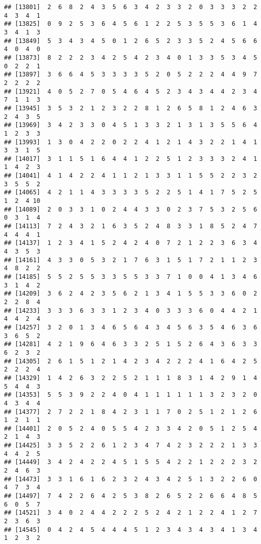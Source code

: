\documentclass[
]{article}
\begin{document}
\begin{verbatim}
## [13801]  2  6  8  2  4  3  5  6  3  4  2  3  3  2  0  3  3  3  2  2  4  3  4  1
## [13825]  0  9  2  5  3  6  4  5  6  1  2  2  5  3  5  5  3  6  1  4  3  4  1  3
## [13849]  5  3  4  3  4  5  0  1  2  6  5  2  3  3  5  2  4  5  6  6  4  0  4  0
## [13873]  8  2  2  2  3  4  2  5  4  2  3  4  0  1  3  3  5  3  4  5  0  2  2  1
## [13897]  3  6  6  4  5  3  3  3  3  5  2  0  5  2  2  2  4  4  9  7  2  2  2  2
## [13921]  4  0  5  2  7  0  5  4  6  4  5  2  3  4  3  4  4  2  3  4  7  1  1  3
## [13945]  3  5  3  2  1  2  3  2  2  8  1  2  6  5  8  1  2  4  6  3  2  4  3  5
## [13969]  3  4  2  3  3  0  4  5  1  3  3  2  1  3  1  3  5  5  6  4  1  2  3  3
## [13993]  1  3  0  4  2  2  0  2  2  4  1  2  1  4  3  2  2  1  4  1  3  3  1  5
## [14017]  3  1  1  5  1  6  4  4  1  2  2  5  1  2  3  3  3  2  4  1  1  4  2  3
## [14041]  4  1  4  2  2  4  1  1  2  1  3  3  1  1  5  5  2  2  3  2  3  5  5  2
## [14065]  4  2  1  1  4  3  3  3  3  5  2  2  5  1  4  1  7  5  2  5  1  2  4 10
## [14089]  2  0  3  3  1  0  2  4  4  3  3  0  2  3  7  5  3  2  5  6  0  3  1  4
## [14113]  7  2  4  3  2  1  6  3  5  2  4  8  3  3  1  8  5  2  4  7  4  4  4  1
## [14137]  1  2  3  4  1  5  2  4  2  4  0  7  2  1  2  2  3  6  3  4  4  3  5  3
## [14161]  4  3  3  0  5  3  2  1  7  6  3  1  5  1  7  2  1  1  2  3  4  8  2  2
## [14185]  5  5  2  5  5  3  3  5  5  3  3  7  1  0  0  4  1  3  4  6  3  1  4  2
## [14209]  3  6  2  4  2  3  5  6  2  1  3  4  1  5  5  3  3  6  0  2  2  2  8  4
## [14233]  3  3  3  6  3  3  1  2  3  4  0  3  3  3  6  0  4  4  2  1  4  4  2  4
## [14257]  3  2  0  1  3  4  6  5  6  4  3  4  5  6  3  5  4  6  3  6  3  6  5  2
## [14281]  4  2  1  9  6  4  6  3  3  2  5  1  5  2  6  4  3  6  3  3  6  2  3  2
## [14305]  2  6  1  5  1  2  1  4  2  3  4  2  2  2  4  1  6  4  2  5  2  2  2  4
## [14329]  1  4  2  6  3  2  2  5  2  1  1  1  8  3  1  4  2  9  1  4  5  4  4  3
## [14353]  5  5  3  9  2  2  4  0  4  1  1  1  1  1  1  3  2  3  2  0  4  3  4  4
## [14377]  2  7  2  2  1  8  4  2  3  1  1  7  0  2  5  1  2  1  2  6  1  2  1  1
## [14401]  2  0  5  2  4  0  5  5  4  2  3  3  4  2  0  5  1  2  5  4  2  1  4  3
## [14425]  3  3  5  2  2  6  1  2  3  4  7  4  2  3  2  2  2  1  3  3  4  4  2  5
## [14449]  3  4  2  4  2  2  4  5  1  5  5  4  2  2  1  2  2  2  3  2  2  4  6  3
## [14473]  3  3  1  6  1  6  2  3  2  4  3  4  2  5  1  3  2  2  6  0  4  7  3  4
## [14497]  7  4  2  2  6  4  2  5  3  8  2  6  5  2  2  6  6  4  8  5  6  0  5  7
## [14521]  3  4  0  2  4  4  2  2  2  5  2  4  2  1  2  2  4  1  2  7  2  3  6  3
## [14545]  0  4  2  4  5  4  4  4  5  1  2  3  4  3  4  3  4  1  3  4  1  2  3  2

\end{verbatim}
\end{document}
